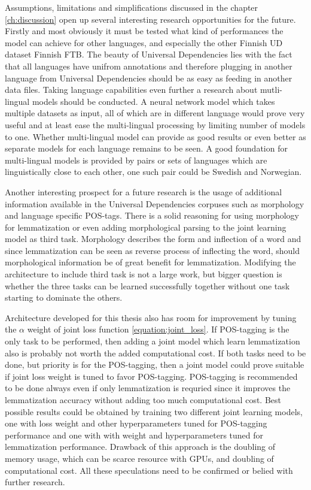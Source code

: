 \documentclass[12pt,a4paper,english
]{tutthesis}
\begin{document}
Assumptions, limitations and simplifications discussed in the chapter \ref{ch:discussion} open up several interesting research opportunities for the future. Firstly and most obviously it must be tested what kind of performances the model can achieve for other languages, and especially the other Finnish UD dataset Finnish FTB. The beauty of Universal Dependencies lies with the fact that all languages have unifrom annotations and therefore plugging in another language from Universal Dependencies should be as easy as feeding in another data files. Taking language capabilities even further a research about mutli-lingual models should be conducted. A neural network model which takes multiple datasets as input, all of which are in different language would prove very useful and at least ease the multi-lingual processing by limiting number of models to one. Whether multi-lingual model can provide as good results or even better as separate models for each language remains to be seen. A good foundation for multi-lingual models is provided by pairs or sets of languages which are linguistically close to each other, one such pair could be Swedish and Norwegian.

Another interesting prospect for a future research is the usage of additional information available in the Universal Dependencies corpuses such as morphology and language specific POS-tags. There is a solid reasoning for using morphology for lemmatization or even adding morphological parsing to the joint learning model as third task. Morphology describes the form and inflection of a word and since lemmatization can be seen as reverse process of inflecting the word, should morphological information be of great benefit for lemmatization. Modifying the architecture to include third task is not a large work, but bigger question is whether the three tasks can be learned successfully together without one task starting to dominate the others.

Architecture developed for this thesis also has room for improvement by tuning the $\alpha$ weight of joint loss function \ref{equation:joint_loss}. If POS-tagging is the only task to be performed, then adding a joint model which learn lemmatization also is probably not worth the added computational cost. If both tasks need to be done, but priority is for the POS-tagging, then a joint model could prove suitable if joint loss weight is tuned to favor POS-tagging. POS-tagging is recommended to be done always even if only lemmatization is requried since it improves the lemmatization accuracy without adding too much computational cost. Best possible results could be obtained by training two different joint learning models, one with loss weight and other hyperparameters tuned for POS-tagging performance and one with with weight and hyperparameters tuned for lemmatization performance. Drawback of this approach is the doubling of memory usage, which can be scarce resource with GPUs, and doubling of computational cost. All these speculations need to be confirmed or belied with further research.
\end{document}
